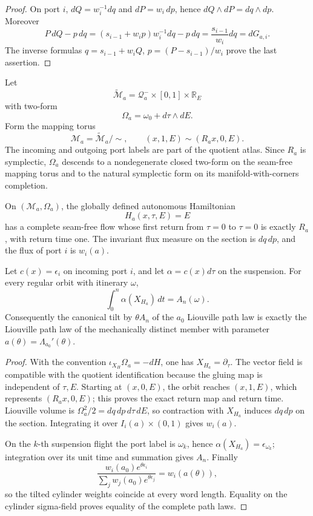 \begin{proof}
On port \(i\), \(dQ=w_i^{-1}dq\) and \(dP=w_i\,dp\), hence
\(dQ\wedge dP=dq\wedge dp\).  Moreover
\[
 P\,dQ-p\,dq
 =\left(s_{i-1}+w_i p\right)w_i^{-1}dq-p\,dq
 =\frac{s_{i-1}}{w_i}dq=dG_{a,i}.
\]
The inverse formulas
\(q=s_{i-1}+w_iQ\), \(p=(P-s_{i-1})/w_i\) prove the last assertion.
\end{proof}

Let
\[
 \widetilde{\mathcal M}_a
 =\mathcal Q_a^-\times[0,1]\times\mathbb R_E
\]
with two-form
\[
 \Omega_a=\omega_0+d\tau\wedge dE.
\]
Form the mapping torus
\[
 \mathcal M_a=
 \widetilde{\mathcal M}_a/\!\sim,
 \qquad
 (x,1,E)\sim(R_ax,0,E).
\]
The incoming and outgoing port labels are part of the quotient atlas.  Since
\(R_a\) is symplectic, \(\Omega_a\) descends to a nondegenerate closed
two-form on the seam-free mapping torus and to the natural symplectic form on
its manifold-with-corners completion.

\begin{theorem}
\label{thm:r3-a1-impact}
On \((\mathcal M_a,\Omega_a)\), the globally defined autonomous Hamiltonian
\[
 H_a(x,\tau,E)=E
\]
has a complete seam-free flow whose first return from \(\tau=0\) to
\(\tau=0\) is exactly \(R_a\), with return time one.  The invariant flux
measure on the section is \(dq\,dp\), and the flux of port \(i\) is
\(w_i(a)\).

Let \(c(x)=\epsilon_i\) on incoming port \(i\), and let
\(\alpha=c(x)d\tau\) on the suspension.  For every regular orbit with
itinerary \(\omega\),
\[
 \int_0^n\alpha(X_{H_a})\,dt=A_n(\omega).
\]
Consequently the canonical tilt by \(\theta A_n\) of the \(a_0\) Liouville
path law is exactly the Liouville path law of the mechanically distinct
member with parameter \(a(\theta)=\Lambda_{a_0}'(\theta)\).
\end{theorem}

\begin{proof}
With the convention
\(\iota_{X_H}\Omega_a=-dH\), one has \(X_{H_a}=\partial_\tau\).  The vector
field is compatible with the quotient identification because the gluing map
is independent of \(\tau,E\).  Starting at \((x,0,E)\), the orbit reaches
\((x,1,E)\), which represents \((R_ax,0,E)\); this proves the exact return
map and return time.  Liouville volume is
\(\Omega_a^2/2=dq\,dp\,d\tau\,dE\), so contraction with
\(X_{H_a}\) induces \(dq\,dp\) on the section.  Integrating it over
\(I_i(a)\times(0,1)\) gives \(w_i(a)\).

On the \(k\)-th suspension flight the port label is \(\omega_k\), hence
\(\alpha(X_{H_a})=\epsilon_{\omega_k}\); integration over its unit time and
summation gives \(A_n\).  Finally
\[
 \frac{w_i(a_0)e^{\theta\epsilon_i}}
 {\sum_jw_j(a_0)e^{\theta\epsilon_j}}
 =w_i(a(\theta)),
\]
so the tilted cylinder weights coincide at every word length.  Equality on
the cylinder sigma-field proves equality of the complete path laws.
\end{proof}

